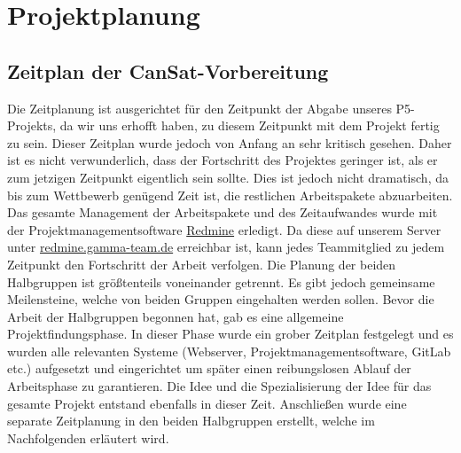 \section{Projektplanung}
\subsection{Zeitplan der CanSat-Vorbereitung}
Die Zeitplanung ist ausgerichtet für den Zeitpunkt der Abgabe unseres P5-Projekts, da wir uns erhofft haben, zu diesem Zeitpunkt mit dem Projekt fertig zu sein. Dieser Zeitplan wurde jedoch von Anfang an sehr kritisch gesehen. Daher ist es nicht verwunderlich, dass der Fortschritt des Projektes geringer ist, als er zum jetzigen Zeitpunkt eigentlich sein sollte. Dies ist jedoch nicht dramatisch, da bis zum Wettbewerb genügend Zeit ist, die restlichen Arbeitspakete abzuarbeiten. Das gesamte Management der Arbeitspakete und des Zeitaufwandes wurde mit der Projektmanagementsoftware \href {www.redmine.org} {Redmine} erledigt. Da diese auf unserem Server unter \href{http://redmine.gamma-team.de}{redmine.gamma-team.de} erreichbar ist, kann jedes Teammitglied zu jedem Zeitpunkt den Fortschritt der Arbeit verfolgen. Die Planung der beiden Halbgruppen ist größtenteils voneinander getrennt. Es gibt jedoch gemeinsame Meilensteine, welche von beiden Gruppen eingehalten werden sollen. Bevor die Arbeit der Halbgruppen begonnen hat, gab es eine allgemeine Projektfindungsphase. In dieser Phase wurde ein grober Zeitplan festgelegt und es wurden alle relevanten Systeme (Webserver, Projektmanagementsoftware, GitLab etc.) aufgesetzt und eingerichtet um später einen reibungslosen Ablauf der Arbeitsphase zu garantieren. Die Idee und die Spezialisierung der Idee für das gesamte Projekt entstand ebenfalls in dieser Zeit. Anschließen wurde eine separate Zeitplanung in den beiden Halbgruppen erstellt, welche im Nachfolgenden erläutert wird.

